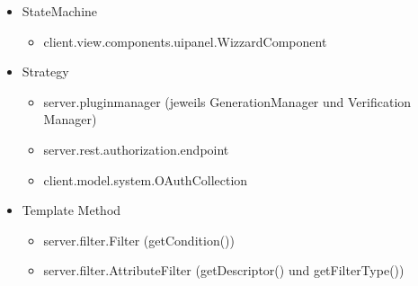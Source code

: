 \begin{itemize}
	\item StateMachine
		\begin{itemize}
			\item client.view.components.uipanel.WizzardComponent
		\end{itemize}
	
	\item Strategy
		\begin{itemize}
			\item server.pluginmanager (jeweils GenerationManager und Verification Manager)
			\item server.rest.authorization.endpoint
			\item client.model.system.OAuthCollection
		\end{itemize}
	
	\item Template Method
		\begin{itemize}
			\item server.filter.Filter (getCondition())
			\item server.filter.AttributeFilter (getDescriptor() und getFilterType())
		\end{itemize}
\end{itemize}